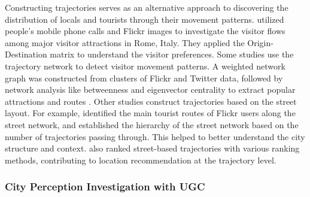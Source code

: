 \documentclass{article}
\theoremstyle{remark}
\begin{document}
Constructing trajectories serves as an alternative approach to discovering the distribution of locals and tourists through their movement patterns. \cite{girardin_digital_2008} utilized people's mobile phone calls and Flickr images to investigate the visitor flows among major visitor attractions in Rome, Italy. They applied the Origin-Destination matrix to understand the visitor preferences. Some studies use the trajectory network to detect visitor movement patterns. A weighted network graph was constructed from clusters of Flickr and Twitter data, followed by network analysis like betweenness and eigenvector centrality to extract popular attractions and routes \citep{straumann_towards_2014, hu_graph-based_2019}. Other studies construct trajectories based on the street layout. For example, \cite{mohino_identifying_2018} identified the main tourist routes of Flickr users along the street network, and \cite{domenech_using_2020} established the hierarchy of the street network based on the number of trajectories passing through. This helped to better understand the city structure and context. \cite{yin_diversified_2011} also ranked street-based trajectories with various ranking methods, contributing to location recommendation at the trajectory level.

\subsubsection{City Perception Investigation with UGC}
\end{document}
